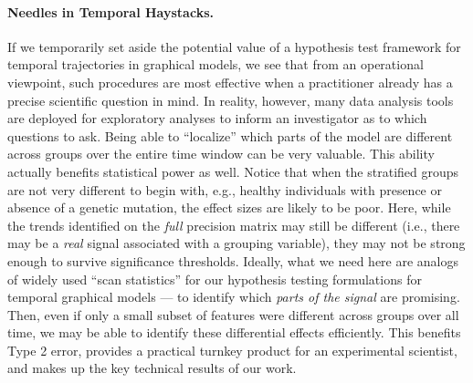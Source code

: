 \paragraph{Needles in Temporal Haystacks.} If we temporarily set aside the potential value of a hypothesis test framework for temporal 
trajectories in graphical models, we see that
from an operational viewpoint, such procedures are most effective when a practitioner already has a precise scientific question in mind. In reality, however, 
many data analysis tools are deployed for exploratory analyses to inform an investigator as to which questions to ask. 
Being able to ``localize'' which parts of the model are different across groups over the entire time window can be very valuable. This ability actually 
benefits statistical power as well. Notice that when the stratified groups are not very different 
to begin with, e.g., healthy individuals with presence or absence of a genetic mutation, the
effect sizes are likely to be poor.
Here, while the trends identified on the {\em full} precision matrix may still be different (i.e., there may be a {\em real} signal 
associated with a grouping variable), 
they may not be strong enough to survive significance thresholds. Ideally, what we need here are analogs of widely used ``scan statistics'' 
for our hypothesis testing formulations for temporal graphical models --- to identify which {\em parts of the signal} are promising. 
Then, even if only a small subset of 
features were different across groups over all time,
we may be able to identify these differential effects efficiently. This benefits Type 2 error, 
provides a practical turnkey product for an experimental scientist, and makes up the key technical results of our work.


